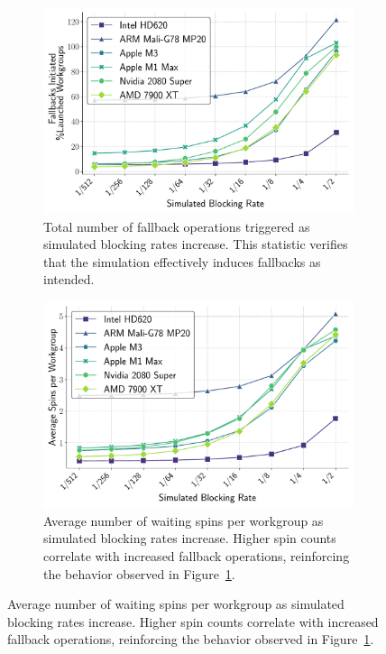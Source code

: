 \documentclass[sigconf,screen]{acmart}
\begin{document}
\begin{figure}
  \centering
  \begin{subfigure}[t]{0.48\linewidth}
    \centering
    \includegraphics[width=\linewidth]{graphics/fallbacksInitiated_plot.pdf}
    \caption{Total number of fallback operations triggered as simulated blocking rates increase. This statistic verifies that the simulation effectively induces fallbacks as intended.\label{fig:fallbacks_initiated}}
  \end{subfigure}\hfill
  \begin{subfigure}[t]{0.48\linewidth}
    \centering
    \includegraphics[width=\linewidth]{graphics/totalSpins_plot.pdf}
    \caption{Average number of waiting spins per workgroup as simulated blocking rates increase. Higher spin counts correlate with increased fallback operations, reinforcing the behavior observed in Figure~\ref{fig:fallbacks_initiated}.\label{fig:total_spins}}
  \end{subfigure}


\end{figure}
\end{document}
